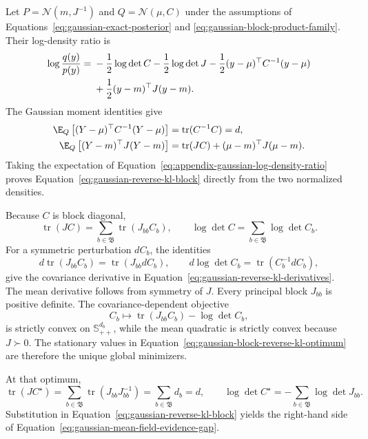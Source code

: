 Let \(P=\mathcal N(m,J^{-1})\) and \(Q=\mathcal N(\mu,C)\) under the assumptions of Equations~\eqref{eq:gaussian-exact-posterior} and \eqref{eq:gaussian-block-product-family}. Their log-density ratio is
\begin{align}
\log\frac{q(y)}{p(y)}
={}&-\frac12\log\det C-\frac12\log\det J
-\frac12(y-\mu)^\top C^{-1}(y-\mu)
\notag\\
&+\frac12(y-m)^\top J(y-m).
\label{eq:appendix-gaussian-log-density-ratio}
\end{align}
The Gaussian moment identities give
\begin{align}
\E_Q\left[(Y-\mu)^\top C^{-1}(Y-\mu)\right]
&=\operatorname{tr}(C^{-1}C)=d,
\label{eq:appendix-gaussian-centered-quadratic}\\
\E_Q\left[(Y-m)^\top J(Y-m)\right]
&=\operatorname{tr}(JC)+(\mu-m)^\top J(\mu-m).
\label{eq:appendix-gaussian-target-quadratic}
\end{align}
Taking the expectation of Equation~\eqref{eq:appendix-gaussian-log-density-ratio} proves Equation~\eqref{eq:gaussian-reverse-kl-block} directly from the two normalized densities.

Because \(C\) is block diagonal,
\begin{equation}
\operatorname{tr}(JC)=\sum_{b\in\mathfrak B}\operatorname{tr}(J_{bb}C_b),
\qquad
\log\det C=\sum_{b\in\mathfrak B}\log\det C_b.
\label{eq:appendix-block-trace-logdet}
\end{equation}
For a symmetric perturbation \(dC_b\), the identities
\begin{equation}
d\operatorname{tr}(J_{bb}C_b)=\operatorname{tr}(J_{bb}dC_b),
\qquad
d\log\det C_b=\operatorname{tr}(C_b^{-1}dC_b),
\label{eq:appendix-block-matrix-differentials}
\end{equation}
give the covariance derivative in Equation~\eqref{eq:gaussian-reverse-kl-derivatives}. The mean derivative follows from symmetry of \(J\). Every principal block \(J_{bb}\) is positive definite. The covariance-dependent objective
\begin{equation}
C_b\longmapsto
\operatorname{tr}(J_{bb}C_b)-\log\det C_b,
\label{eq:appendix-covariance-block-objective}
\end{equation}
is strictly convex on \(\mathbb S_{++}^{d_b}\), while the mean quadratic is strictly convex because \(J\succ0\). The stationary values in Equation~\eqref{eq:gaussian-block-reverse-kl-optimum} are therefore the unique global minimizers.

At that optimum,
\begin{equation}
\operatorname{tr}(JC^\star)
=\sum_{b\in\mathfrak B}\operatorname{tr}(J_{bb}J_{bb}^{-1})
=\sum_{b\in\mathfrak B}d_b=d,
\qquad
\log\det C^\star=-\sum_{b\in\mathfrak B}\log\det J_{bb}.
\label{eq:appendix-gaussian-optimum-substitution}
\end{equation}
Substitution in Equation~\eqref{eq:gaussian-reverse-kl-block} yields the right-hand side of Equation~\eqref{eq:gaussian-mean-field-evidence-gap}.

